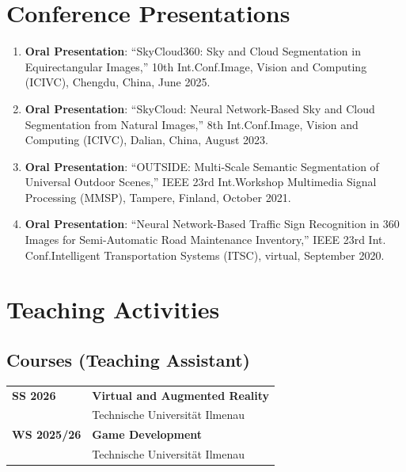 \documentclass[11pt,a4paper]{article}
\begin{document}
\section*{Conference Presentations}

\begin{enumerate}[nosep, leftmargin=1.5em, itemsep=4pt]
  \item \textbf{Oral Presentation}: ``SkyCloud360: Sky and Cloud Segmentation in
    Equirectangular Images,'' 10th Int.\@ Conf.\@ Image, Vision and Computing (ICIVC),
    Chengdu, China, June 2025.

  \item \textbf{Oral Presentation}: ``SkyCloud: Neural Network-Based Sky and Cloud
    Segmentation from Natural Images,'' 8th Int.\@ Conf.\@ Image, Vision and Computing
    (ICIVC), Dalian, China, August 2023.

  \item \textbf{Oral Presentation}: ``OUTSIDE: Multi-Scale Semantic Segmentation of
    Universal Outdoor Scenes,'' IEEE 23rd Int.\@ Workshop Multimedia Signal Processing
    (MMSP), Tampere, Finland, October 2021.

  \item \textbf{Oral Presentation}: ``Neural Network-Based Traffic Sign Recognition in
    360\textdegree{} Images for Semi-Automatic Road Maintenance Inventory,'' IEEE 23rd Int.\@
    Conf.\@ Intelligent Transportation Systems (ITSC), virtual, September 2020.
\end{enumerate}

\section*{Teaching Activities}

\subsection*{Courses (Teaching Assistant)}

\noindent\begin{tabularx}{\textwidth}{@{}p{3.5cm}L@{}}
\textbf{SS 2026} & \textbf{Virtual and Augmented Reality}\\
 & Technische Universit\"at Ilmenau\\[6pt]
\textbf{WS 2025/26} & \textbf{Game Development}\\
 & Technische Universit\"at Ilmenau\\
\end{tabularx}
\end{document}
